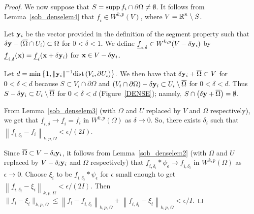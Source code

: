 \begin{proof}
We now suppose that $S = \operatorname{supp} f_i \cap \partial \Omega \neq \emptyset$.
It follows from Lemma~\ref{sob_denselem4} that
$\displaystyle \underline{f}_i \in W^{k,p}(V)$, where
$\displaystyle V = \mathbb{R}^n \setminus S$.

Let $\mathbf{y}_i$ be the vector provided in the definition of the segment property
such that\\
$\delta \mathbf{y} + (\overline{\Omega} \cap U_i) \subset \Omega$
for $0 < \delta < 1$.  We define
$\displaystyle \underline{f}_{i,\delta} \in W^{k,p}(V-\delta \mathbf{y}_i)$ by
$\underline{f}_{i,\delta}(\mathbf{x}) = \underline{f}_i(\mathbf{x} + \delta \mathbf{y}_i)$
for $\mathbf{x} \in V - \delta \mathbf{y}_i$.

Let $\displaystyle d
= \min \left\{ 1 , \|\mathbf{y}_i\|^{-1} \mathrm{dist}\left(V_i,\partial U_i\right) \right\}$.
We then have that $\delta \mathbf{y}_i + \overline{\Omega} \subset V$ for
$0 < \delta < d$ because $S \subset V_i \cap \partial \Omega$ and
$\displaystyle (V_i \cap \partial \Omega) - \delta \mathbf{y}_i
\subset U_i \setminus \overline{\Omega}$ for $0 < \delta < d$.
Thus
$\displaystyle S - \delta \mathbf{y}_i \subset U_i \setminus \overline{\Omega}$ for
$0 < \delta < d$ (Figure~\ref{DENSE}); namely,
$S \cap \left(\delta\mathbf{y} + \overline{\Omega}\right) = \emptyset$.

From Lemma~\ref{sob_denselem3} (with $\Omega$ and $U$ replaced by $V$ and
$\Omega$ respectively), we get that
$\displaystyle \underline{f}_{i,\delta} \to \underline{f}_i = f_i$
in $\displaystyle W^{k,p}(\Omega)$ as $\delta \to 0$.
So, there exists $\delta_i$ such that
$\displaystyle \left\|\underline{f}_{i,\delta_i} - f_i \right\|_{k,p,\Omega}
< \epsilon/(2I)$.

Since $\overline{\Omega} \subset V - \delta_i \mathbf{y}_i$, it follows
from Lemma~\ref{sob_denselem2} (with $\Omega$ and $U$ replaced by
$V-\delta_i \mathbf{y}_i$ and $\Omega$ respectively) that
$\displaystyle \underline{f}_{i,\delta_i} \ast \psi_\epsilon \to
\underline{f}_{i,\delta_i}$ in $\displaystyle W^{k,p}(\Omega)$ 
as $\epsilon \to 0$.  Choose $\xi_i$ to be
$\underline{f}_{i,\delta_i} \ast \psi_\epsilon$
for $\epsilon$ small enough to get
$\displaystyle \left\|\underline{f}_{i,\delta_i} - \xi_i\right\|_{k,p,\Omega}
< \epsilon/(2I)$.
Then
$\displaystyle \|f_i - \xi_i\|_{k,p,\Omega} \leq
\left\|f_i - \underline{f}_{i,\delta_i} \right\|_{k,p,\Omega}
+ \left\|\underline{f}_{i,\delta_i} - \xi_i\right\|_{k,p,\Omega} < \epsilon/I$.
\end{proof}


